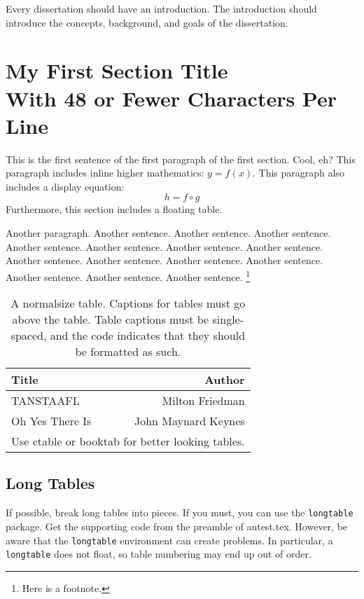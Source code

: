 \documentclass[10pt,econ,letterpaper]{authesis}
\begin{document}
Every dissertation should have an introduction.
The introduction should introduce the concepts, background, and goals of the dissertation.


%
%
\section{My First Section Title\\With 48 or Fewer Characters Per Line}

This is the first sentence of the first paragraph of the first section. Cool, eh?
This paragraph includes inline higher mathematics: $y=f(x)$.
This paragraph also includes a display equation:
\begin{equation}
h = f \circ g
\end{equation}
Furthermore, this section includes a floating table.

Another paragraph.
Another sentence. Another sentence. Another sentence. Another sentence. Another sentence. Another sentence. Another sentence. Another sentence. Another sentence. Another sentence. Another sentence. Another sentence. Another sentence. Another sentence.%
\footnote{%
Here is a footnote.}
%


\begin{table}[h]\centering
\caption{A normalsize table.
Captions for tables must go above the table.
Table captions must be single-spaced,
and the code indicates that they should be formatted as such.}
\begin{tabular}{lr}\hline\hline
Title & Author \\ \hline
TANSTAAFL & Milton Friedman \\
Oh Yes There Is & John Maynard Keynes \\ \hline
\multicolumn{2}{c}{\small Use ctable or booktab for better looking tables.}
\end{tabular}
\end{table}

\subsection{Long Tables}

If possible, break long tables into pieces.
If you must, you can use the \texttt{longtable} package.
Get the supporting code from the preamble of autest.tex.
However, be aware that the \texttt{longtable} environment
can create problems.
In particular, a \texttt{longtable} does not float,
so table numbering may end up out of order.
\end{document}
